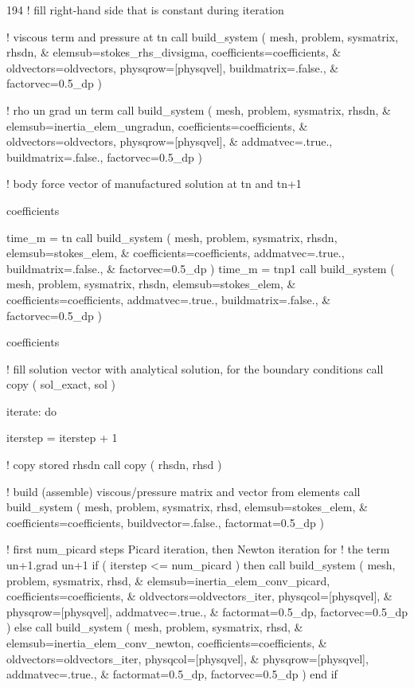 \begin{listing}{194}
!   fill right-hand side that is constant during iteration

!  viscous term and pressure at tn
    call build_system ( mesh, problem, sysmatrix, rhsdn, &
      elemsub=stokes_rhs_divsigma, coefficients=coefficients, &
      oldvectors=oldvectors, physqrow=[physqvel], buildmatrix=.false., &
      factorvec=0.5_dp )

!   rho un grad un term
    call build_system ( mesh, problem, sysmatrix, rhsdn, &
      elemsub=inertia_elem_ungradun, coefficients=coefficients, &
      oldvectors=oldvectors, physqrow=[physqvel], &
      addmatvec=.true., buildmatrix=.false., factorvec=0.5_dp )

!   body force vector of manufactured solution at tn and tn+1

    coefficients%

    time_m = tn
    call build_system ( mesh, problem, sysmatrix, rhsdn, elemsub=stokes_elem, &
      coefficients=coefficients, addmatvec=.true., buildmatrix=.false., &
      factorvec=0.5_dp )
    time_m = tnp1
    call build_system ( mesh, problem, sysmatrix, rhsdn, elemsub=stokes_elem, &
      coefficients=coefficients, addmatvec=.true., buildmatrix=.false., &
      factorvec=0.5_dp )

    coefficients%

!   fill solution vector with analytical solution, for the boundary conditions
    call copy ( sol_exact, sol )
    
    iterate: do

      iterstep = iterstep + 1

!     copy stored rhsdn
      call copy ( rhsdn, rhsd )

!     build (assemble) viscous/pressure matrix and vector from elements 
      call build_system ( mesh, problem, sysmatrix, rhsd, elemsub=stokes_elem, &
        coefficients=coefficients, buildvector=.false., factormat=0.5_dp )

!     first num_picard steps Picard iteration, then Newton iteration for
!     the term un+1.grad un+1
      if ( iterstep <= num_picard ) then
        call build_system ( mesh, problem, sysmatrix, rhsd, &
          elemsub=inertia_elem_conv_picard, coefficients=coefficients, &
          oldvectors=oldvectors_iter, physqcol=[physqvel], &
          physqrow=[physqvel], addmatvec=.true., &
          factormat=0.5_dp, factorvec=0.5_dp )
      else
        call build_system ( mesh, problem, sysmatrix, rhsd, &
          elemsub=inertia_elem_conv_newton, coefficients=coefficients, &
          oldvectors=oldvectors_iter, physqcol=[physqvel], &
          physqrow=[physqvel], addmatvec=.true., &
          factormat=0.5_dp, factorvec=0.5_dp )
      end if


\end{listing}
